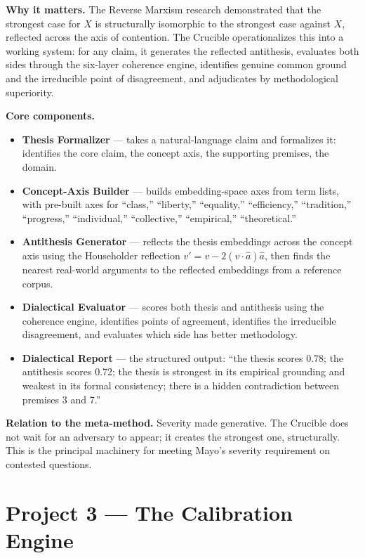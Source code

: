 \documentclass[11pt,letterpaper]{article}
\begin{document}
\textbf{Why it matters.} The Reverse Marxism research demonstrated that the strongest case for $X$ is structurally isomorphic to the strongest case against $X$, reflected across the axis of contention. The Crucible operationalizes this into a working system: for any claim, it generates the reflected antithesis, evaluates both sides through the six-layer coherence engine, identifies genuine common ground and the irreducible point of disagreement, and adjudicates by methodological superiority.

\textbf{Core components.}

\begin{itemize}[leftmargin=1.5em,itemsep=0.1em]
\item \textbf{Thesis Formalizer} --- takes a natural-language claim and formalizes it: identifies the core claim, the concept axis, the supporting premises, the domain.
\item \textbf{Concept-Axis Builder} --- builds embedding-space axes from term lists, with pre-built axes for ``class,'' ``liberty,'' ``equality,'' ``efficiency,'' ``tradition,'' ``progress,'' ``individual,'' ``collective,'' ``empirical,'' ``theoretical.''
\item \textbf{Antithesis Generator} --- reflects the thesis embeddings across the concept axis using the Householder reflection $v' = v - 2(v \cdot \hat{a})\hat{a}$, then finds the nearest real-world arguments to the reflected embeddings from a reference corpus.
\item \textbf{Dialectical Evaluator} --- scores both thesis and antithesis using the coherence engine, identifies points of agreement, identifies the irreducible disagreement, and evaluates which side has better methodology.
\item \textbf{Dialectical Report} --- the structured output: ``the thesis scores 0.78; the antithesis scores 0.72; the thesis is strongest in its empirical grounding and weakest in its formal consistency; there is a hidden contradiction between premises 3 and 7.''
\end{itemize}

\textbf{Relation to the meta-method.} Severity made generative. The Crucible does not wait for an adversary to appear; it creates the strongest one, structurally. This is the principal machinery for meeting Mayo's severity requirement on contested questions.

\section{Project 3 --- The Calibration Engine}
\end{document}
